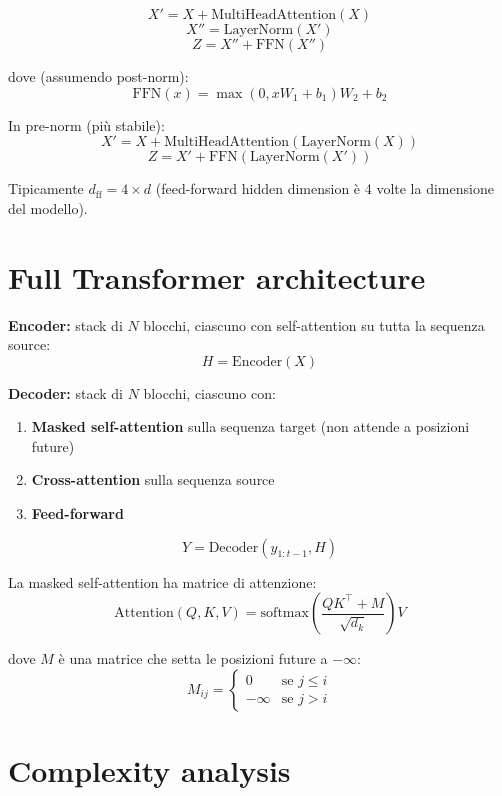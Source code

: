 \begin{definition}
\[
X' = X + \text{MultiHeadAttention}(X)
\]
\[
X'' = \text{LayerNorm}(X')
\]
\[
Z = X'' + \text{FFN}(X'')
\]

dove (assumendo post-norm):
\[
\text{FFN}(x) = \max(0, x W_1 + b_1) W_2 + b_2
\]

In pre-norm (più stabile):
\[
X' = X + \text{MultiHeadAttention}(\text{LayerNorm}(X))
\]
\[
Z = X' + \text{FFN}(\text{LayerNorm}(X'))
\]

Tipicamente $d_{\text{ff}} = 4 \times d$ (feed-forward hidden dimension è 4 volte la dimensione del modello).
\end{definition}

\section{Full Transformer architecture}

\begin{definition}
\textbf{Encoder:} stack di $N$ blocchi, ciascuno con self-attention su tutta la sequenza source:
\[
H = \text{Encoder}(X)
\]

\textbf{Decoder:} stack di $N$ blocchi, ciascuno con:
\begin{enumerate}
\item \textbf{Masked self-attention} sulla sequenza target (non attende a posizioni future)
\item \textbf{Cross-attention} sulla sequenza source
\item \textbf{Feed-forward}
\end{enumerate}

\[
Y = \text{Decoder}(y_{1:t-1}, H)
\]

La masked self-attention ha matrice di attenzione:
\[
\text{Attention}(Q, K, V) = \text{softmax}\left(\frac{QK^\top + M}{\sqrt{d_k}}\right) V
\]

dove $M$ è una matrice che setta le posizioni future a $-\infty$:
\[
M_{ij} = \begin{cases} 0 & \text{se } j \leq i \\ -\infty & \text{se } j > i \end{cases}
\]
\end{definition}

\section{Complexity analysis}

